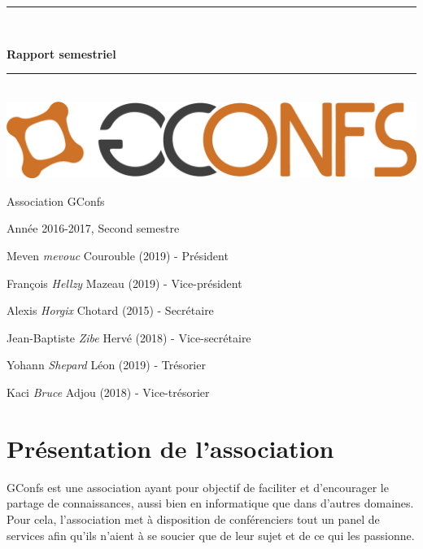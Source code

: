 \documentclass[12pt,a4paper]{article}
\newcommand{\HRule}{\rule{\linewidth}{0.5mm}}
\begin{document}
\begin{center}

\begingroup
\thispagestyle{empty}
\vspace*{1cm}
\HRule \\[0.8cm]
\par\normalfont\fontsize{35}{35}\sffamily\selectfont
\textbf{Rapport semestriel}\\
\HRule \\[2cm]
\includegraphics[scale=0.2]{gconfs.png}\par
{\large Association GConfs}\par
\vspace*{1cm}
{\large Année 2016-2017, Second semestre}\par
\vspace*{2cm}
\endgroup
\begingroup
\par\normalfont\fontsize{35}{16}\sffamily\selectfont
{\large Meven \emph{mevouc} Courouble (2019) - Président}\par
{\large François \emph{Hellzy} Mazeau (2019) - Vice-président}\par
{\large Alexis \emph{Horgix} Chotard (2015) - Secrétaire}\par
{\large Jean-Baptiste \emph{Zibe} Hervé (2018) - Vice-secrétaire}\par
{\large Yohann \emph{Shepard} Léon (2019) - Trésorier}\par
{\large Kaci \emph{Bruce} Adjou (2018) - Vice-trésorier}\par
\endgroup


\end{center}
\newpage

\setlength{\headheight}{15pt}
\pagestyle{fancy}
\author{Yohann LEON}
\renewcommand{\footrulewidth}{0.1 mm}

  \newpage
  \tableofcontents

\newpage

\section{Présentation de l'association}

GConfs est une association ayant pour objectif de faciliter et d’encourager le partage de
connaissances, aussi bien en informatique que dans d'autres domaines. Pour cela, l’association
met à disposition de conférenciers tout un panel de services afin qu’ils n’aient à se soucier que de leur sujet et de ce qui les passionne.
\end{document}

